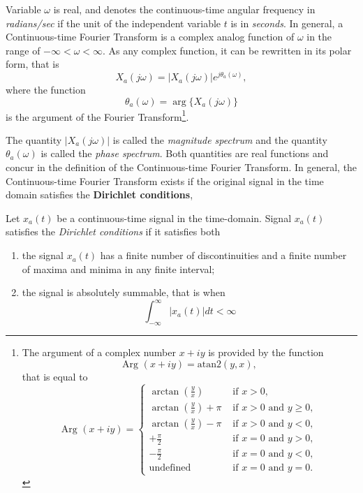 \documentclass[\documentfontsize, twocolumn]{\classname}
\begin{document}
Variable $\omega$ is real, and denotes the continuous-time angular frequency in \emph{radians/sec} if the unit of the independent variable $t$ is in \emph{seconds}. In general, a Continuous-time Fourier Transform is a complex analog function of $\omega$ in the range of $-\infty < \omega < \infty$. As any complex function, it can be rewritten in its polar form, that is
\begin{equation}\label{eqn:continuousTimeFourierTransformPolar}
    X_a(j\omega) = \left|X_a(j\omega)\right|e^{j\theta_a(\omega)},
\end{equation}
where the function 
\begin{equation}\label{eqn:continuousTimeFourierTransformPolarTheta}
    \theta_a(\omega)=\arg\{X_a(j\omega)\}
\end{equation}
is the argument of the Fourier Transform\footnote{
    The argument of a complex number $x+iy$ is provided by the function \[\mbox{Arg }(x+iy) = \mbox{atan2} (y, x),\] that is equal to
    \[
        \mbox{Arg }(x+iy) = \left\{\begin{array}{ll}
                \arctan{(\frac y x)} & \mbox { if } x>0,\\
                \arctan{(\frac y x)} + \pi & \mbox { if } x>0 \mbox { and } y \geq 0,\\
                \arctan{(\frac y x)} - \pi & \mbox { if } x>0 \mbox { and } y < 0,\\
                +\frac \pi 2  & \mbox { if } x=0 \mbox { and } y>0,\\
                -\frac \pi 2  & \mbox { if } x=0 \mbox { and } y<0,\\
                \mathrm{ undefined } & \mbox{ if } x=0 \mbox { and } y = 0.
            \end{array}\right.
    \]
}.

The quantity $|X_a(j\omega)|$ is called the \emph{magnitude spectrum} and the quantity $\theta_a(\omega)$ is called the \emph{phase spectrum}. Both quantities are real functions and concur in the definition of the Continuous-time Fourier Transform. In general, the Continuous-time Fourier Transform exists if the original signal in the time domain satisfies the \textbf{Dirichlet conditions},
\begin{rules}
    Let $x_a(t)$ be a continuous-time signal in the time-domain. Signal $x_a(t)$ satisfies the \emph{Dirichlet conditions} if it satisfies both
    \begin{enumerate}
        \item the signal $x_a(t)$ has a finite number of discontinuities and a finite number of maxima and minima in any finite interval;
        \item the signal is absolutely summable, that is when
            \[
                \int_{-\infty}^\infty |x_a(t)|dt < \infty
            \]
    \end{enumerate}
\end{rules}
\end{document}
